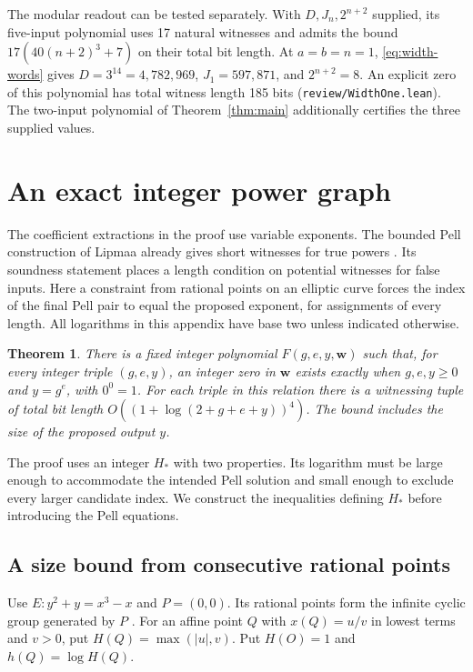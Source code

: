\documentclass[11pt,letterpaper]{article}
\newtheorem{theorem}{Theorem}[section]
\numberwithin{equation}{section}
\begin{document}
The modular readout can be tested separately. With $D,J_n,2^{n+2}$ supplied, its five-input polynomial uses 17 natural witnesses and admits the bound $17(40(n+2)^3+7)$ on their total bit length. At $a=b=n=1$, \eqref{eq:width-words} gives $D=3^{14}=4{,}782{,}969$, $J_1=597{,}871$, and $2^{n+2}=8$. An explicit zero of this polynomial has total witness length 185 bits (\texttt{review/WidthOne.lean}). The two-input polynomial of Theorem~\ref{thm:main} additionally certifies the three supplied values.

\appendix

\section{An exact integer power graph}\label{sec:exact-power}

The coefficient extractions in the proof use variable exponents. The
bounded Pell construction of Lipmaa already gives short witnesses for true powers \cite[Thm.~3]{lipmaa03}. Its soundness statement places a length condition on potential witnesses for false inputs. Here a constraint from rational points on an elliptic curve forces the index of the final Pell pair to equal the proposed exponent, for assignments of every length. All logarithms in this appendix have base two unless indicated otherwise.

\begin{theorem}\label{thm:power-graph}
There is a fixed integer polynomial $F(g,e,y,\mathbf w)$ such that, for every integer triple $(g,e,y)$, an integer zero in $\mathbf w$ exists exactly when $g,e,y\ge0$ and $y=g^e$, with $0^0=1$. For each triple in this relation there is a witnessing tuple of total bit length $O((1+\log(2+g+e+y))^4)$. The bound includes the size of the proposed output $y$.
\end{theorem}

The proof uses an integer $H_*$ with two properties. Its logarithm
must be large enough to accommodate the intended Pell solution and
small enough to exclude every larger candidate index. We construct
the inequalities defining $H_*$ before introducing the Pell equations.

\subsection{A size bound from consecutive rational points}

Use $E\colon y^2+y=x^3-x$ and $P=(0,0)$. Its rational points form
the infinite cyclic group generated by $P$ \cite{cremona,curve}. For an affine
point $Q$ with $x(Q)=u/v$ in lowest terms and $v>0$, put
$H(Q)=\max(|u|,v)$. Put $H(O)=1$ and $h(Q)=\log H(Q)$.
\end{document}
